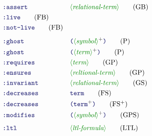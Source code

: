 \documentclass[runningheads]{llncs}
\begin{document}
\begin{align}
& \terminal{:assert}
    && \nonterminal{relational-term}
    \tag{GB} \\
& \terminal{:live}
    \tag{FB} \\
& \terminal{:not-live}
    \tag{FB} \\[4pt]
& \terminal{:ghost}
    && \LP \nonterminal{symbol}\rplus \RP
    \tag{P} \\
& \terminal{:ghost}
    && \LP \nonterminal{term}\rplus \RP
    \tag{P} \\
& \terminal{:requires}
    && \nonterminal{term}
    \tag{GP} \\
& \terminal{:ensures}
    && \nonterminal{reltional-term}
    \tag{GP} \\
& \terminal{:invariant}
    && \nonterminal{relational-term}
    \tag{GS} \\
& \terminal{:decreases}
    && \terminal{term}
    \tag{FS} \\
& \terminal{:decreases}
    && \LP \terminal{term}\rplus \RP
    \tag{FS$^+$} \\
& \terminal{:modifies}
    && \LP \nonterminal{symbol}\rplus \RP
    \tag{GPS} \\[4pt]
& \terminal{:ltl}
    && \nonterminal{ltl-formula}
    \tag{LTL}
\end{align}
\end{document}
